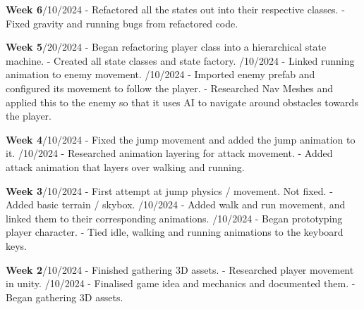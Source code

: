 \documentclass[]{final_report}
\begin{document}
\textbf{Week 6}/10/2024
\newline- Refactored all the states out into their respective classes.
\newline- Fixed gravity and running bugs from refactored code.

\textbf{Week 5}/20/2024
\newline- Began refactoring player class into a hierarchical state machine.
\newline- Created all state classes and state factory.
/10/2024
\newline- Linked running animation to enemy movement.
/10/2024
\newline- Imported enemy prefab and configured its movement to follow the player.
\newline- Researched Nav Meshes and applied this to the enemy so that it uses AI to navigate around obstacles towards the player.

\textbf{Week 4}/10/2024
\newline- Fixed the jump movement and added the jump animation to it.
/10/2024
\newline- Researched animation layering for attack movement.
\newline- Added attack animation that layers over walking and running.

\textbf{Week 3}/10/2024
\newline- First attempt at jump physics / movement. Not fixed.
\newline- Added basic terrain / skybox.
/10/2024
\newline- Added walk and run movement, and linked them to their corresponding animations.
/10/2024
\newline- Began prototyping player character.
\newline- Tied idle, walking and running animations to the keyboard keys.

\textbf{Week 2}/10/2024
\newline- Finished gathering 3D assets.
\newline- Researched player movement in unity.
/10/2024
\newline- Finalised game idea and mechanics and documented them.
\newline- Began gathering 3D assets.
\end{document}
